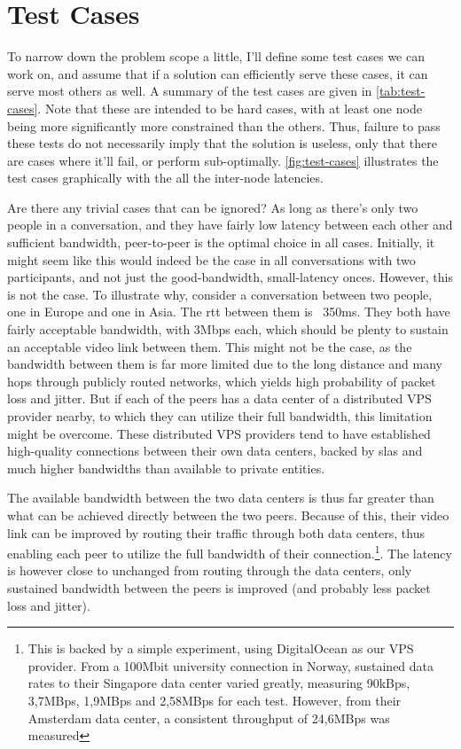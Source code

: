 \chapter{Test Cases}\label{chp:test-cases}

To narrow down the problem scope a little, I'll define some test cases we can work on, and assume that if a solution can efficiently serve these cases, it can serve most others as well. A summary of the test cases are given in \autoref{tab:test-cases}. Note that these are intended to be hard cases, with at least one node being more significantly more constrained than the others. Thus, failure to pass these tests do not necessarily imply that the solution is useless, only that there are cases where it'll fail, or perform sub-optimally. \autoref{fig:test-cases} illustrates the test cases graphically with the all the inter-node latencies.

Are there any trivial cases that can be ignored? As long as there's only two people in a conversation, and they have fairly low latency between each other and sufficient bandwidth, peer-to-peer is the optimal choice in all cases. Initially, it might seem like this would indeed be the case in all conversations with two participants, and not just the good-bandwidth, small-latency onces. However, this is not the case. To illustrate why, consider a conversation between two people, one in Europe and one in Asia. The \gls{rtt} between them is ~350ms. They both have fairly acceptable bandwidth, with 3Mbps each, which should be plenty to sustain an acceptable video link between them. This might not be the case, as the bandwidth between them is far more limited due to the long distance and many hops through publicly routed networks, which yields high probability of packet loss and jitter. But if each of the peers has a data center of a distributed VPS provider nearby, to which they can utilize their full bandwidth, this limitation might be overcome. These distributed VPS providers tend to have established high-quality connections between their own data centers, backed by \glspl{sla} and much higher bandwidths than available to private entities.

The available bandwidth between the two data centers is thus far greater than what can be achieved directly between the two peers. Because of this, their video link can be improved by routing their traffic through both data centers, thus enabling each peer to utilize the full bandwidth of their connection.\footnote{This is backed by a simple experiment, using DigitalOcean as our VPS provider. From a 100Mbit university connection in Norway, sustained data rates to their Singapore data center varied greatly, measuring 90kBps, 3,7MBps, 1,9MBps and 2,58MBps for each test. However, from their Amsterdam data center, a consistent throughput of 24,6MBps was measured}. The latency is however close to unchanged from routing through the data centers, only sustained bandwidth between the peers is improved (and probably less packet loss and jitter).

